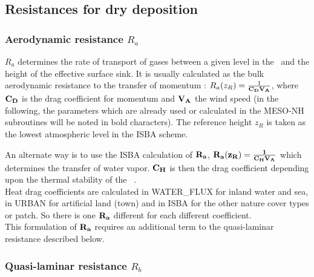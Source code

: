
\subsection{Resistances for dry deposition}
\subsubsection*{Aerodynamic resistance $R_a$}

$R_a$ determines the rate of transport of gases between a given level in the
\atm~and the height of the effective surface sink. 
It is usually calculated as the bulk aerodynamic resistance to the transfer of
momentum :  $R_a(z_R)=\frac{1}{\bf{C_D} \bf{V_A}}$, where $\bf{C_D}$ is the drag
coefficient for momentum
\citep[see for example][]{Wesely1977,Sheih1979,Walcek1986}
and $\bf{V_A}$ the wind speed (in the following, the parameters which are
already used or calculated in the MESO-NH subroutines will be noted in bold
characters).
The reference height $z_R$ is taken as the lowest atmospheric level in
the ISBA scheme.
\medskip

An alternate way is to use the ISBA calculation of $\bf {R_a}$,
$\bf{R_a(z_R)}=\frac{1}{\bf{C_H} \bf{V_A}}$ 
which determines the transfer of water
vapor. $\bf{C_H}$ is then the drag coefficient depending upon the thermal
stability of the \atm~.  \\
Heat drag coefficients are calculated in WATER\_FLUX for inland water
and sea, in URBAN for artificial land (town) and in ISBA for the other 
nature cover types or patch. So there is one $\bf {R_a}$ different for
each different coefficient.
\\
This formulation of $\bf {R_a}$ requires an additional term to the
quasi-laminar resistance described below.
\subsubsection*{Quasi-laminar resistance $R_b$}

